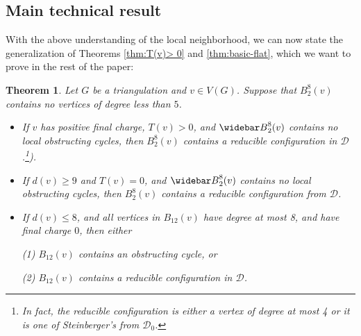 \documentclass[10pt,a4paper]{article}
\newtheorem{thm}{Theorem}[section]
\renewcommand{\bar}{\widebar}
\newcommand{\mikkel}[1]{\textbf{\textcolor{red}{{M: } #1}}}
\def\showlabel#1{}
\begin{document}
\subsection{Main technical result}

With the above understanding of the local neighborhood, we can now state the generalization of
Theorems \ref{thm:T(v)> 0} and \ref{thm:basic-flat}, which we want to prove in the rest of the paper:


\begin{thm}\label{thm:main-theorem}\showlabel{thm:main-theorem}
Let $G$ be a triangulation and $v\in V(G)$. Suppose that $B^8_2(v)$ contains no vertices of degree less than $5$. 
\begin{itemize}
    \item[(i)] If $v$ has positive final charge, $T(v) > 0$, and ${\bar B}^8_2(v)$ contains no local obstructing cycles, then $B^8_2(v)$ contains a reducible configuration in ${\mathcal D}$.\footnote{In fact,
    the reducible configuration is either a vertex of degree at most 4 or it is one of Steinberger's \cite{steinberger2010unavoidable} from  $\mathcal{D}_0$.}).
    \item[(ii)] If $d(v)\ge9$ and $T(v) = 0$, and ${\bar B}^8_2(v)$ contains no local  obstructing cycles, then $B^8_2(v)$ contains a reducible configuration from $\mathcal{D}$.
    \item[(iii)] If $d(v)\le8$, and all vertices in 
    $B_{12}(v)$
    have degree at most 8, and have final charge $0$, then either
     
    (1) $B_{12}(v)$ contains an obstructing cycle, or 
    

    (2) $B_{12}(v)$ contains a reducible configuration in $\mathcal{D}$. 
    \end{itemize}
\end{thm}
\end{document}
